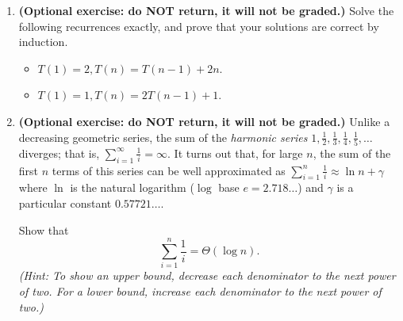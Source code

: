 \documentclass[11pt]{article}
\begin{document}
\begin{enumerate}
\newpage 

\item {\bf (Optional exercise: do NOT return, it will not be graded.)} Solve the following recurrences exactly, and prove that your solutions are correct by induction. 
\begin{itemize}
\item $T(1) = 2, T(n) = T(n-1) + 2n$.
\item $T(1) = 1, T(n) = 2T(n-1) + 1$.
\end{itemize}

\bigskip

\item {\bf (Optional exercise: do NOT return, it will not be graded.)}
Unlike a decreasing geometric series, the sum of the {\em harmonic series} 
$1, \frac{1}{2}, \frac{1}{3}, \frac{1}{4}, \frac{1}{5}, \ldots$ diverges; that is,
$\sum\limits_{i=1}^{\infty} \frac{1}{i} = \infty.$
It turns out that, for large $n$, the sum of the first $n$ terms of this series
can be well approximated as
$\sum\limits_{i=1}^{n} \frac{1}{i} \approx \ln{n} + \gamma$
where $\ln$ is the natural logarithm ($\log$ base $e= 2.718\ldots$) and
$\gamma$ is a particular constant $0.57721\ldots$. 

Show that
$$
\sum_{i=1}^{n} \frac{1}{i} = \Theta(\log{n}).
$$
{\em (Hint: To show an upper bound, decrease each denominator to 
the next power of two. For a lower bound, increase each denominator
to the next power of two.)}
\end{enumerate} 
\end{document}
